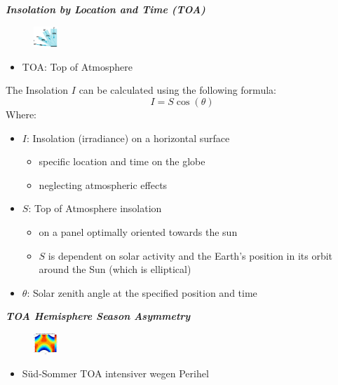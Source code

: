 \documentclass[fontsize=8pt, a4paper, landscape, fleqn]{scrartcl}
\renewcommand{\subsubsection}[1]{%
    \noindent\textbf{\textit{\color{subsectioncolor}#1}}%
    \vspace{1mm}%
}
\begin{document}
\begin{multicols*}{3}[\raggedcolumns]
\subsubsection{Insolation by Location and Time (TOA)}
\begin{figure}
    \centering
    \includegraphics[width=0.08\textwidth]{Secondary/img/Pasted image 20250407180808.png}
\end{figure}
\begin{itemize}
    \item TOA: Top of Atmosphere
\end{itemize}
The Insolation $I$ can be calculated using the following formula:
$$I = S \cos(\theta)$$
Where:
\begin{itemize}
    \item $I$: Insolation (irradiance) on a horizontal surface
        \begin{itemize}
            \item specific location and time on the globe
            \item neglecting atmospheric effects
        \end{itemize}
    \item $S$: Top of Atmosphere insolation
        \begin{itemize}
            \item on a panel optimally oriented towards the sun
            \item $S$ is dependent on solar activity and the Earth's position in its orbit around the Sun (which is elliptical)
        \end{itemize}
    \item $\theta$: Solar zenith angle at the specified position and time
\end{itemize}

\subsubsection{TOA Hemisphere Season Asymmetry}
\begin{figure}
    \centering
    \includegraphics[width=0.08\textwidth]{Secondary/img/Pasted image 20250408112850.png}
\end{figure}
\begin{itemize}
    \item Süd-Sommer TOA intensiver wegen Perihel
\end{itemize}


\end{multicols*}
\end{document}
